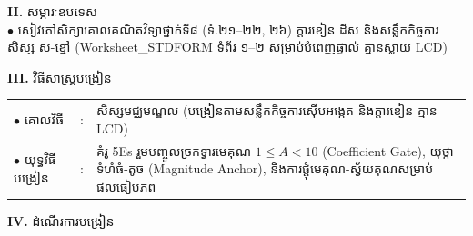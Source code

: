 \documentclass[a4paper,10pt]{article}
\newcommand{\en}[1]{{\TimesEn #1}}
\begin{document}
{%
\textbf{II.} {\muol សម្ភារៈឧបទេស}\\[1pt]
\hspace*{0.55cm}$\bullet$ \hspace{0.35cm} សៀវភៅសិក្សាគោលគណិតវិទ្យាថ្នាក់ទី៨ (ទំ.២១–២២, ២៦) ក្ដារខៀន ដីស និងសន្លឹកកិច្ចការសិស្ស ស-ខ្មៅ (\en{Worksheet\_STDFORM} ទំព័រ ១–២ សម្រាប់បំពេញផ្ទាល់ គ្មានស្លាយ \en{LCD})

\vspace{2pt}

\textbf{III.} {\muol វិធីសាស្រ្តបង្រៀន}\\[1pt]
\hspace*{0.45cm}%
\begin{tabular}{@{}l l L{14.85cm}@{}}
  $\bullet$ \hspace{0.25cm} គោលវិធី & : & សិស្សមជ្ឈមណ្ឌល (បង្រៀនតាមសន្លឹកកិច្ចការស៊ើបអង្កេត និងក្ដារខៀន គ្មាន \en{LCD}) \\
  $\bullet$ \hspace{0.25cm} យុទ្ធវិធីបង្រៀន & : & គំរូ \en{5Es} រួមបញ្ចូលច្រកទ្វារមេគុណ $1\le A < 10$ (\en{Coefficient Gate}), យុថ្កាទំហំធំ-តូច (\en{Magnitude Anchor}), និងការផ្ដុំមេគុណ-ស្វ័យគុណសម្រាប់ផលធៀបភព \\
\end{tabular}
}

\vspace{2pt}

\textbf{IV.} {\muol ដំណើរការបង្រៀន}

\vspace{1pt}
\end{document}
